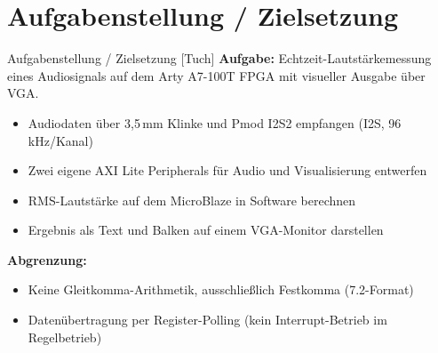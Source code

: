 \section{Aufgabenstellung / Zielsetzung}
\begin{frame}{Aufgabenstellung / Zielsetzung [Tuch]}
    \textbf{Aufgabe:} Echtzeit-Lautstärkemessung eines Audiosignals auf dem Arty A7-100T FPGA mit visueller Ausgabe über VGA.
    \begin{itemize}
        \item Audiodaten über 3{,}5\,mm Klinke und Pmod I2S2 empfangen (I2S, 96\,kHz/Kanal)
        \item Zwei eigene AXI Lite Peripherals für Audio und Visualisierung entwerfen
        \item RMS-Lautstärke auf dem MicroBlaze in Software berechnen
        \item Ergebnis als Text und Balken auf einem VGA-Monitor darstellen
    \end{itemize}
    \vspace{0.4em}
    \textbf{Abgrenzung:}
    \begin{itemize}
        \item Keine Gleitkomma-Arithmetik, ausschließlich Festkomma (7.2-Format)
        \item Datenübertragung per Register-Polling (kein Interrupt-Betrieb im Regelbetrieb)
    \end{itemize}
\end{frame}
